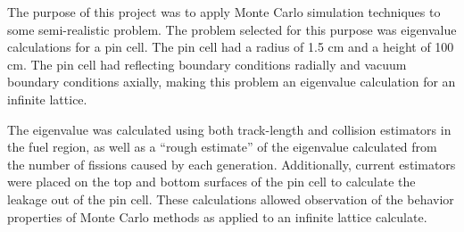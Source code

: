
The purpose of this project was to apply Monte Carlo simulation techniques to some semi-realistic problem.  The problem selected for this purpose was eigenvalue calculations for a pin cell.  The pin cell had a radius of 1.5 cm and a height of 100 cm.  The pin cell had reflecting boundary conditions radially and vacuum boundary conditions axially, making this problem an eigenvalue calculation for an infinite lattice. 

The eigenvalue was calculated using both track-length and collision estimators in the fuel region, as well as a ``rough estimate'' of the eigenvalue calculated from the number of fissions caused by each generation.  Additionally, current estimators were placed on the top and bottom surfaces of the pin cell to calculate the leakage out of the pin cell.  These calculations allowed observation of the behavior properties of Monte Carlo methods as applied to an infinite lattice calculate.